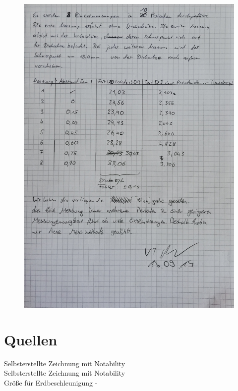 \documentclass[11pt,a4paper]{article}
\begin{document}
\begin{figure}[H]
	\includegraphics[width=1\linewidth]{S3.jpg}
	\centering
\end{figure}
\newpage
\section{Quellen}
\text{[1]}  \hspace{2cm} Selbsterstellte Zeichnung mit Notability\\
\text{[2]} \hspace{2cm} Selbsterstellte Zeichnung mit Notability\\
\text{[3]} \hspace{2cm} Größe für Erdbeschleunigung -
%


%
\end{document}
